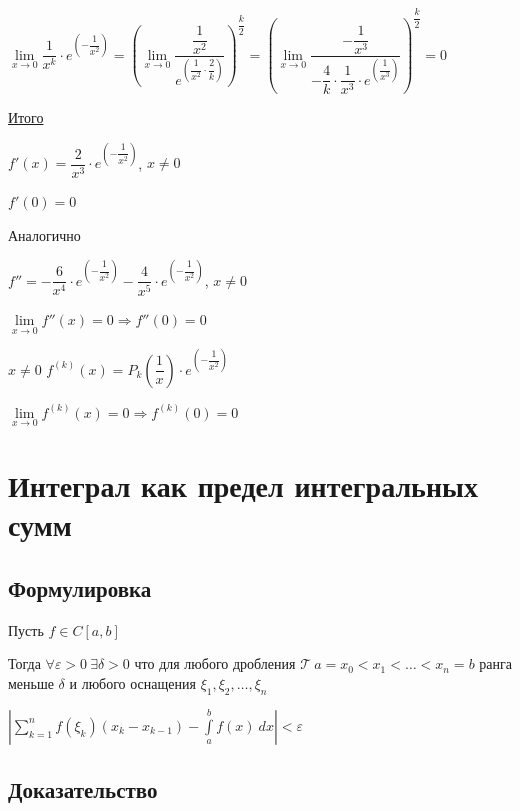 \documentclass{article}
\begin{document}
			$\lim\limits_{x \rightarrow 0} \dfrac{1}{x^k} \cdot e^{\left(-\dfrac{1}{x^2}\right)} = \left(\lim\limits_{x \rightarrow 0} \dfrac{\dfrac{1}{x^2}}{e^{\left(\dfrac{1}{x^2} \cdot \dfrac{2}{k}\right)}} \right)^{\dfrac{k}{2}} = \left( \lim\limits_{x \rightarrow 0} \dfrac{-\dfrac{1}{x^3}}{-\dfrac{4}{k} \cdot \dfrac{1}{x^3} \cdot e^{\left(\dfrac{1}{x^3}\right)}} \right)^{\dfrac{k}{2}} = 0$
			
			\underline{Итого}
			
			$f'(x) = \dfrac{2}{x^3} \cdot e^{\left(-\dfrac{1}{x^2}\right)}$, $x \neq 0$
			
			$f'(0) = 0$
			
			Аналогично
			
			$f'' = -\dfrac{6}{x^4} \cdot e^{\left(-\dfrac{1}{x^2}\right)} - \dfrac{4}{x^5} \cdot e^{\left(-\dfrac{1}{x^2}\right)}$, $x \neq 0$
			
			$\lim\limits_{x \rightarrow 0} f''(x) = 0 \Rightarrow f''(0) = 0$
			
			$x \neq 0$ $f^{(k)} (x) = P_k \left(\dfrac{1}{x}\right) \cdot e^{\left(-\dfrac{1}{x^2}\right)}$
			
			$\lim\limits_{x \rightarrow 0} f^{(k)}(x) = 0 \Rightarrow f^{(k)}(0) = 0$
			
	\newpage

	\section{Интеграл как предел интегральных сумм}

		\subsection{Формулировка}

			Пусть $f \in C[a, b]$

			Тогда $\forall \varepsilon > 0 \ \exists \delta > 0$ что для любого дробления $\mathcal{T} \ a = x_0 < x_1 < \ldots < x_n = b$ ранга меньше $\delta$ и любого оснащения $\xi_1, \xi_2, \ldots, \xi_n$

			$\left| \sum\limits^n_{k = 1} f(\xi_k)(x_k - x_{k - 1}) - \int\limits^b_a f(x) \ dx \right| < \varepsilon$

		\subsection{Доказательство}
\end{document}
